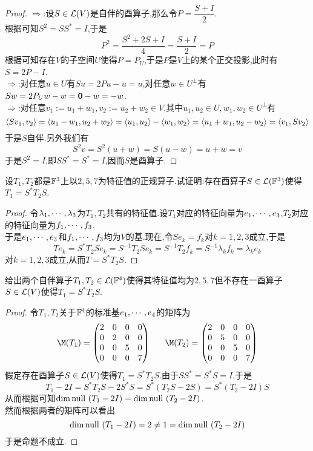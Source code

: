 \documentclass{ctexart}
\begin{document}
\begin{proof}
    $\Rightarrow$:设$S\in\mathcal{L}(V)$是自伴的酉算子,那么令$P=\dfrac{S+I}{2}$.\\
    根据可知$S^2=SS^*=I$,于是
    \[P^2=\dfrac{S^2+2S+I}{4}=\dfrac{S+I}{2}=P\]
    根据可知存在$V$的子空间$U$使得$P=P_U$,于是$P$是$V$上的某个正交投影,此时有$S=2P-I$.\\
    $\Rightarrow$:对任意$u\in U$有$Su=2Pu-u=u$,对任意$w\in U^\bot$有$Sw=2P_Uw-w=\mathbf0-w=-w$.\\
    $\Rightarrow$:对任意$v_1:=u_1+w_1,v_2:=u_2+w_2\in V$,其中$u_1,u_2\in U,w_1,w_2\in U^\bot$有
    \[\left\langle{Sv_1},{v_2}\right\rangle=\left\langle{u_1-w_1},{u_2+w_2}\right\rangle=\left\langle{u_1},{u_2}\right\rangle-\left\langle{w_1},{w_2}\right\rangle=\left\langle{u_1+w_1},{u_2-w_2}\right\rangle=\left\langle{v_1},{Sv_2}\right\rangle\]
    于是$S$自伴.另外我们有
    \[S^2v=S^2(u+w)=S(u-w)=u+w=v\]
    于是$S^2=I$,即$SS^*=S^*=I$,因而$S$是酉算子.
\end{proof}
\begin{problem}[6.]
    设$T_1,T_2$都是$\mathbb{F}^3$上以$2,5,7$为特征值的正规算子.试证明:存在酉算子$S\in\mathcal{L}(\mathbb{F}^3)$使得$T_1=S^*T_2S$.
\end{problem}
\begin{proof}
    令${\lambda}_1,\cdots,{\lambda}_{3}$为$T_1,T_2$共有的特征值.设$T_1$对应的特征向量为${e}_1,\cdots,{e}_{3}$,$T_2$对应的特征向量为${f}_1,\cdots,{f}_{3}$.\\
    于是${e}_1,\cdots,{e}_{3}$和${f}_1,\cdots,{f}_{3}$均为$V$的基.现在,令$Se_k=f_k$对$k=1,2,3$成立,于是
    \[Te_k=S^*T_2Se_k=S^{-1}T_2Se_k=S^{-1}T_2f_k=S^{-1}\lambda_k f_k=\lambda_ke_k\]
    对$k=1,2,3$成立,从而$T=S^*T_2S$.
\end{proof}
\begin{problem}[7.]
    给出两个自伴算子$T_1,T_2\in\mathcal{L}(\mathbb{F}^4)$使得其特征值均为$2,5,7$但不存在一酉算子$S\in\mathcal{L}(V)$使得$T_1=S^*T_2S$.
\end{problem}
\begin{proof}
    令$T_1,T_2$关于$\mathbb{F}^4$的标准基${e}_1,\cdots,{e}_{4}$的矩阵为
    \[\M(T_1)=\begin{pmatrix}
        2&0&0&0\\
        0&2&0&0\\
        0&0&5&0\\
        0&0&0&7
    \end{pmatrix}\ \ \ \ \ 
    \M(T_2)=\begin{pmatrix}
        2&0&0&0\\
        0&5&0&0\\
        0&0&5&0\\
        0&0&0&7
    \end{pmatrix}\]
    假定存在酉算子$S\in\mathcal{L}(V)$使得$T_1=S^*T_2S$.由于$SS^*=S^*S=I$,于是
    \[T_1-2I=S^*T_2S-2S^*S=S^*(T_2S-2S)=S^*(T_2-2I)S\]
    从而根据可知$\dim\text{null }(T_1-2I)=\dim\text{null }(T_2-2I)$.\\
    然而根据两者的矩阵可以看出
    \[\dim\text{null }(T_1-2I)=2\neq1=\dim\text{null }(T_2-2I)\]
    于是命题不成立.
\end{proof}
\end{document}
